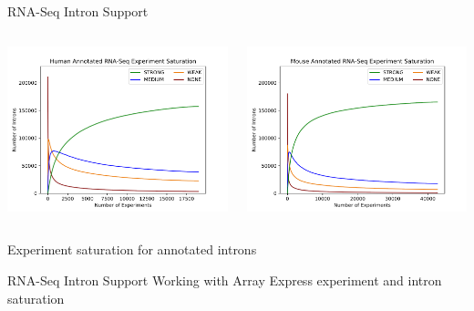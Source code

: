 \documentclass[10pt,
               hyperref={bookmarks=false,
                         bookmarksopen=false,
                         colorlinks=true,
                         linkcolor=blue,
                         urlcolor=blue},
               xcolor={svgnames,table}]{beamer}
\begin{document}
\begin{frame}{RNA-Seq Intron Support}
  \begin{columns}
    \begin{column}{0.5\textwidth}
      \includegraphics[scale=0.37]{images/hs_saturation_annot.pdf}
    \end{column}
    \begin{column}{0.5\textwidth}
      \includegraphics[scale=0.37]{images/mm_saturation_annot.pdf}
    \end{column}
  \end{columns}
  Experiment saturation for annotated introns
\end{frame}

\begin{frame}{RNA-Seq Intron Support}
  Working with Array Express
  experiment and intron saturation
  
\end{frame}
\end{document}

